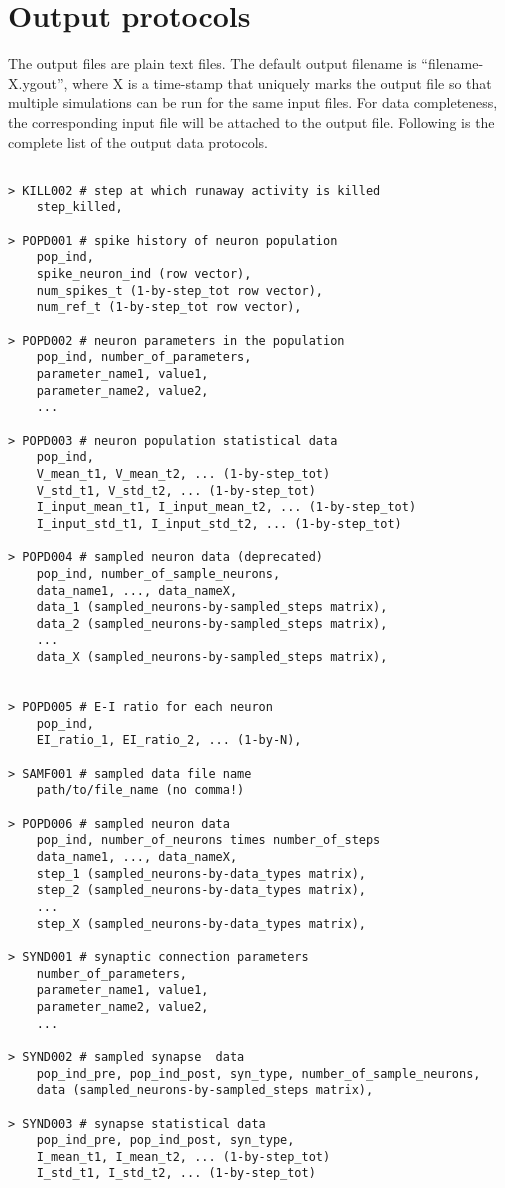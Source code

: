 \documentclass{article}
\begin{document}
\section{Output protocols}
\label{sec:Output protocols}
The output files are plain text files.
The default output filename is ``filename-X.ygout'', where X is a time-stamp that uniquely marks the output file so that multiple simulations can be run for the same input files.
For data completeness, the corresponding input file will be attached to the output file.
Following is the complete list of the output data protocols.
\begin{lstlisting}

> KILL002 # step at which runaway activity is killed
	step_killed,

> POPD001 # spike history of neuron population
	pop_ind,
	spike_neuron_ind (row vector),
	num_spikes_t (1-by-step_tot row vector),
	num_ref_t (1-by-step_tot row vector),

> POPD002 # neuron parameters in the population
	pop_ind, number_of_parameters,
	parameter_name1, value1,
	parameter_name2, value2,
	...

> POPD003 # neuron population statistical data
	pop_ind,
	V_mean_t1, V_mean_t2, ... (1-by-step_tot)
	V_std_t1, V_std_t2, ... (1-by-step_tot)
	I_input_mean_t1, I_input_mean_t2, ... (1-by-step_tot)
	I_input_std_t1, I_input_std_t2, ... (1-by-step_tot)
	
> POPD004 # sampled neuron data (deprecated)
	pop_ind, number_of_sample_neurons,
	data_name1, ..., data_nameX,
	data_1 (sampled_neurons-by-sampled_steps matrix),
	data_2 (sampled_neurons-by-sampled_steps matrix),
	...
	data_X (sampled_neurons-by-sampled_steps matrix),


> POPD005 # E-I ratio for each neuron
	pop_ind,
	EI_ratio_1, EI_ratio_2, ... (1-by-N),
	
> SAMF001 # sampled data file name
	path/to/file_name (no comma!)

> POPD006 # sampled neuron data
	pop_ind, number_of_neurons times number_of_steps
	data_name1, ..., data_nameX,
	step_1 (sampled_neurons-by-data_types matrix),
	step_2 (sampled_neurons-by-data_types matrix),
	...
	step_X (sampled_neurons-by-data_types matrix),
	
> SYND001 # synaptic connection parameters
	number_of_parameters,
	parameter_name1, value1,
	parameter_name2, value2,
	...

> SYND002 # sampled synapse  data
	pop_ind_pre, pop_ind_post, syn_type, number_of_sample_neurons,
	data (sampled_neurons-by-sampled_steps matrix),

> SYND003 # synapse statistical data
	pop_ind_pre, pop_ind_post, syn_type,
	I_mean_t1, I_mean_t2, ... (1-by-step_tot)
	I_std_t1, I_std_t2, ... (1-by-step_tot)
	
	

\end{lstlisting}

{}

\end{document}

